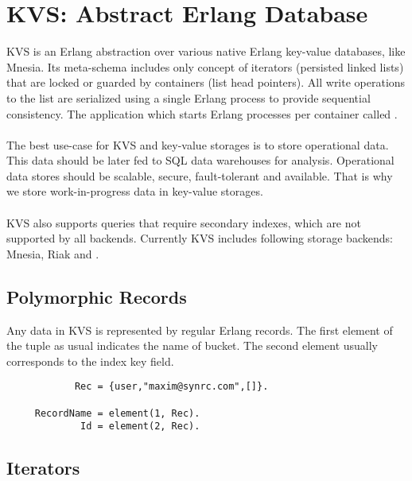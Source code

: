 \section{KVS: Abstract Erlang Database}

KVS is an Erlang abstraction over various native Erlang key-value databases,
like Mnesia. Its meta-schema includes only concept
of iterators (persisted linked lists) that are locked or guarded by
containers (list head pointers). All write operations to the list are
serialized using a single Erlang process to provide sequential consistency. The application
which starts Erlang processes per container called .

\paragraph{}
The best use-case for KVS and key-value storages is to store operational data.
This data should be later fed to SQL data warehouses for analysis. Operational data
stores should be scalable, secure, fault-tolerant and available. That is why
we store work-in-progress data in key-value storages.

\paragraph{}
KVS also supports queries that require secondary indexes, which
are not supported by all backends.
Currently KVS includes following storage backends: Mnesia, Riak and .

\subsection{Polymorphic Records}

Any data in KVS is represented by regular Erlang records.
The first element of the tuple as usual indicates the name of bucket.
The second element usually corresponds to the index key field.

\begin{lstlisting}
            Rec = {user,"maxim@synrc.com",[]}.

     RecordName = element(1, Rec).
             Id = element(2, Rec).
\end{lstlisting}

\newpage
\subsection{Iterators}

